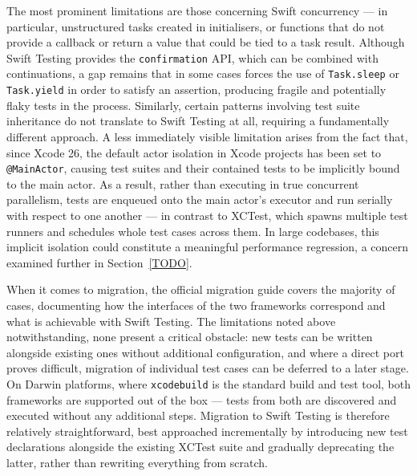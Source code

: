 The most prominent limitations are those concerning Swift concurrency --- in particular,
unstructured tasks created in initialisers, or functions that do not provide a
callback or return a value that could be tied to a task result. Although Swift Testing
provides the \texttt{confirmation} API, which can be combined with continuations, a
gap remains that in some cases forces the use of \texttt{Task.sleep} or
\texttt{Task.yield} in order to satisfy an assertion, producing fragile and
potentially flaky tests in the process. Similarly, certain patterns involving test
suite inheritance do not translate to Swift Testing at all, requiring a fundamentally
different approach. A less immediately visible limitation arises from the fact that,
since Xcode 26, the default actor isolation in Xcode projects has been set to
\texttt{@MainActor}, causing test suites and their contained tests to be implicitly
bound to the main actor. As a result, rather than executing in true concurrent
parallelism, tests are enqueued onto the main actor's executor and run serially with
respect to one another --- in contrast to XCTest, which spawns multiple test runners
and schedules whole test cases across them. In large codebases, this implicit
isolation could constitute a meaningful performance regression, a concern examined
further in Section~\ref{TODO}.

When it comes to migration, the official migration guide \cite{apple2024migration}
covers the majority of cases, documenting how the interfaces of the two frameworks
correspond and what is achievable with Swift Testing. The limitations noted above
notwithstanding, none present a critical obstacle: new tests can be written alongside
existing ones without additional configuration, and where a direct port proves
difficult, migration of individual test cases can be deferred to a later stage. On
Darwin platforms, where \texttt{xcodebuild} is the standard build and test tool,
both frameworks are supported out of the box --- tests from both are discovered and
executed without any additional steps. Migration to Swift Testing is therefore
relatively straightforward, best approached incrementally by introducing new test
declarations alongside the existing XCTest suite and gradually deprecating the latter,
rather than rewriting everything from scratch.

